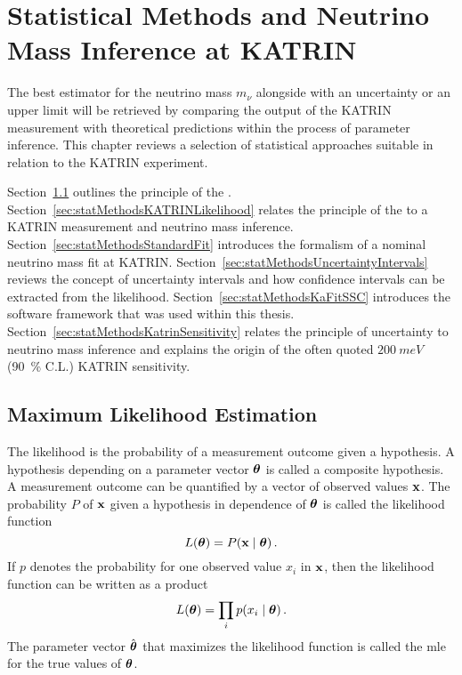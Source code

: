 \def\currentRootFolder{chapter/statisticalMethods}
\def\currentFigureFolder{\currentRootFolder/fig}


\chapter{Statistical Methods and Neutrino Mass Inference at KATRIN}
\label{sec:statMethods}
The best estimator for the neutrino mass $m_\nu$ alongside with an uncertainty or an upper limit will be retrieved by comparing the output of the KATRIN measurement with theoretical predictions within the process of parameter inference. This chapter reviews a selection of statistical approaches suitable in relation to the KATRIN experiment.

Section~\ref{sec:statMethodsMLE} outlines the principle of the . Section~\ref{sec:statMethodsKATRINLikelihood} relates the principle of the  to a KATRIN measurement and neutrino mass inference. Section~\ref{sec:statMethodsStandardFit} introduces the formalism of a nominal neutrino mass fit at KATRIN. Section~\ref{sec:statMethodsUncertaintyIntervals} reviews the concept of uncertainty intervals and how confidence intervals can be extracted from the likelihood. Section~\ref{sec:statMethodsKaFitSSC} introduces the software framework that was used within this thesis. Section~\ref{sec:statMethodsKatrinSensitivity} relates the principle of uncertainty to neutrino mass inference and explains the origin of the often quoted $\SI{200}{meV}$ (\SI{90}{\percent} C.L.) KATRIN sensitivity.

\section{Maximum Likelihood Estimation}
\label{sec:statMethodsMLE}
The likelihood is the probability of a measurement outcome given a hypothesis. A hypothesis depending on a parameter vector $\boldsymbol{\mathbf{\theta}}$ is called a composite hypothesis. A measurement outcome can be quantified by a vector of observed values $\boldsymbol{\mathbf{x}}$. The probability $P$ of $\boldsymbol{\mathbf{x}}$ given a hypothesis in dependence of $\boldsymbol{\mathbf{\theta}}$ is called the likelihood function~\cite{ReviewOfParticlePhysics}
\begin{equation}
	L(\paramVec) = P\giventhat{\dataVec}{\paramVec}
	\fullstop
\end{equation}
If $p$ denotes the probability for one observed value $x_i$ in $\boldsymbol{\mathbf{x}}$, then the likelihood function can be written as a product~\cite{ReviewOfParticlePhysics}
\begin{equation}
	L(\paramVec) = \prod_{i} p\giventhat{x_i}{\paramVec}
	\fullstop
\end{equation}
The parameter vector $\hat{\boldsymbol{\mathbf{\theta}}}$ that maximizes the likelihood function is called the \gls{mle} for the true values of $\boldsymbol{\mathbf{\theta}}$.

